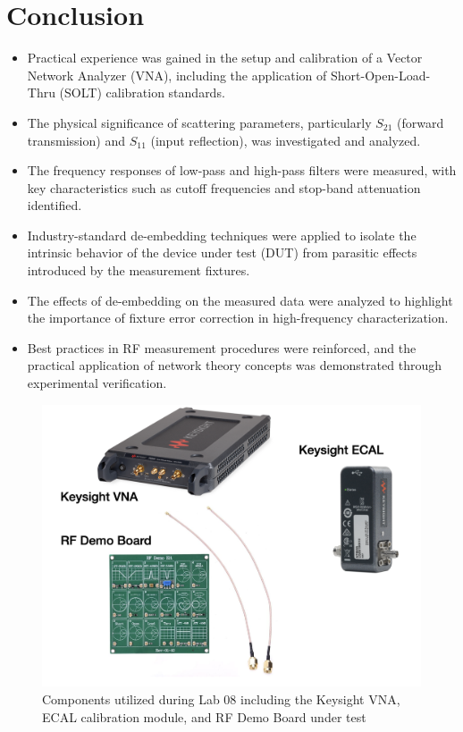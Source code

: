 \section{Conclusion}

\justifying
\begin{itemize}
\item Practical experience was gained in the setup and calibration of a Vector Network Analyzer (VNA), including the application of Short-Open-Load-Thru (SOLT) calibration standards.
\item The physical significance of scattering parameters, particularly \(S_{21}\) (forward transmission) and \(S_{11}\) (input reflection), was investigated and analyzed.
\item The frequency responses of low-pass and high-pass filters were measured, with key characteristics such as cutoff frequencies and stop-band attenuation identified.
\item Industry-standard de-embedding techniques were applied to isolate the intrinsic behavior of the device under test (DUT) from parasitic effects introduced by the measurement fixtures.
\item The effects of de-embedding on the measured data were analyzed to highlight the importance of fixture error correction in high-frequency characterization.
\item Best practices in RF measurement procedures were reinforced, and the practical application of network theory concepts was demonstrated through experimental verification.
\end{itemize}

\begin{center}
\begin{figure}[H]
\includegraphics[scale=0.5]{Chapter_8/images/Lab_08_Image_1.png}
\caption{Components utilized during Lab 08 including the Keysight VNA, ECAL calibration module, and RF Demo Board under test}
\label{Ch8_fig:12}
\end{figure}
\end{center}

\clearpage
\printbibliography[heading=subbibliography]